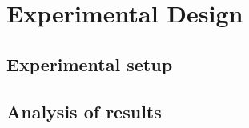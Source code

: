 \chapter{Experimental Design}


\section{Experimental setup}

\blindtext

\section{Analysis of results}

\blindtext